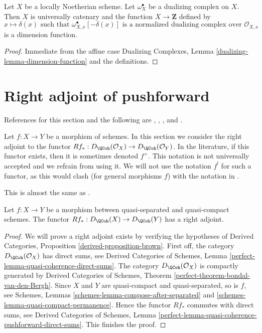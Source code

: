 \begin{lemma}
\label{lemma-dimension-function-scheme}
Let $X$ be a locally Noetherian scheme. Let $\omega_X^\bullet$
be a dualizing complex on $X$. Then $X$ is universally catenary
and the function
$X \to \mathbf{Z}$ defined by
$$
x \longmapsto \delta(x)\text{ such that }
\omega_{X, x}^\bullet[-\delta(x)]
\text{ is a normalized dualizing complex over }
\mathcal{O}_{X, x}
$$
is a dimension function.
\end{lemma}

\begin{proof}
Immediate from the affine case
Dualizing Complexes, Lemma \ref{dualizing-lemma-dimension-function}
and the definitions.
\end{proof}






\section{Right adjoint of pushforward}
\label{section-twisted-inverse-image}

\noindent
References for this section and the following are
\cite{Neeman-Grothendieck}, \cite{LN},
\cite{Lipman-notes}, and \cite{Neeman-improvement}.

\medskip\noindent
Let $f : X \to Y$ be a morphism of schemes.
In this section we consider the right adjoint to the functor
$Rf_* : D_\QCoh(\mathcal{O}_X) \to D_\QCoh(\mathcal{O}_Y)$.
In the literature, if this functor exists, then it is sometimes
denoted $f^{\times}$. This notation is not universally accepted and we refrain
from using it. We will not use the notation $f^!$ for such a functor,
as this would clash (for general morphisms $f$) with the notation in
\cite{RD}.

\begin{lemma}
\label{lemma-twisted-inverse-image}
\begin{reference}
This is almost the same as \cite[Example 4.2]{Neeman-Grothendieck}.
\end{reference}
Let $f : X \to Y$ be a morphism between quasi-separated and quasi-compact
schemes. The functor $Rf_* : D_\QCoh(X) \to D_\QCoh(Y)$ has a
right adjoint.
\end{lemma}

\begin{proof}
We will prove a right adjoint exists by verifying the hypotheses of
Derived Categories, Proposition \ref{derived-proposition-brown}.
First off, the category $D_\QCoh(\mathcal{O}_X)$ has direct sums, see
Derived Categories of Schemes, Lemma
\ref{perfect-lemma-quasi-coherence-direct-sums}.
The category $D_\QCoh(\mathcal{O}_X)$ is compactly generated by
Derived Categories of Schemes, Theorem
\ref{perfect-theorem-bondal-van-den-Bergh}.
Since $X$ and $Y$ are quasi-compact and quasi-separated, so is $f$, see
Schemes, Lemmas \ref{schemes-lemma-compose-after-separated} and
\ref{schemes-lemma-quasi-compact-permanence}.
Hence the functor $Rf_*$ commutes with direct sums, see
Derived Categories of Schemes, Lemma
\ref{perfect-lemma-quasi-coherence-pushforward-direct-sums}.
This finishes the proof.
\end{proof}

